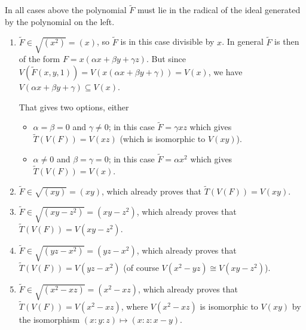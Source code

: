 \begin{exercise}{2}
\begin{enumerate}
            In all cases above the polynomial $\widetilde{F}$ must lie in the
            radical of the ideal generated by the polynomial on the left.
            \begin{enumerate}
                \item{$\widetilde{F} \in \sqrt{(x^2)} = (x)$, so $\widetilde{F}$
                    is in this case divisible by $x$. In general $\widetilde{F}$
                    is then of the form $F = x (\alpha x + \beta y + \gamma z)$.
                    But since $V(\widetilde{F}(x, y, 1)) = V(x (\alpha x + \beta
                    y + \gamma)) = V(x)$, we have $V(\alpha x + \beta y +
                    \gamma) \subseteq V(x)$.

                    That gives two options, either
                    \begin{itemize}
                        \item{$\alpha = \beta = 0$ and $\gamma \not= 0$; in this
                            case $\widetilde{F} = \gamma xz$ which gives
                            $\widetilde{T}(V(F)) = V(xz)$ (which is
                            isomorphic to $V(xy)$).}
                        \item{$\alpha \not= 0$ and $\beta = \gamma = 0$; in this
                            case $\widetilde{F} = \alpha x^2$ which gives
                            $\widetilde{T}(V(F)) = V(x)$.}
                    \end{itemize}
                    }
                \item{$\widetilde{F} \in \sqrt{(xy)} = (xy)$, which already
                    proves that $\widetilde{T}(V(F)) = V(xy)$.}
                \item{$\widetilde{F} \in \sqrt{(xy - z^2)} = (xy - z^2)$, which already
                    proves that $\widetilde{T}(V(F)) = V(xy - z^2)$.}
                \item{$\widetilde{F} \in \sqrt{(yz - x^2)} = (yz - x^2)$, which already
                    proves that $\widetilde{T}(V(F)) = V(yz - x^2)$ (of course
                    $V(x^2 - yz) \cong V(xy - z^2)$).}
                \item{$\widetilde{F} \in \sqrt{(x^2 - xz)} = (x^2 - xz)$, which already
                    proves that $\widetilde{T}(V(F)) = V(x^2 - xz)$, where
                    $V(x^2 - xz)$ is isomorphic to $V(xy)$ by the isomorphism
                    $(x : y : z) \mapsto (x : z : x - y)$.}
            \end{enumerate}

    \end{enumerate}
\end{exercise}

